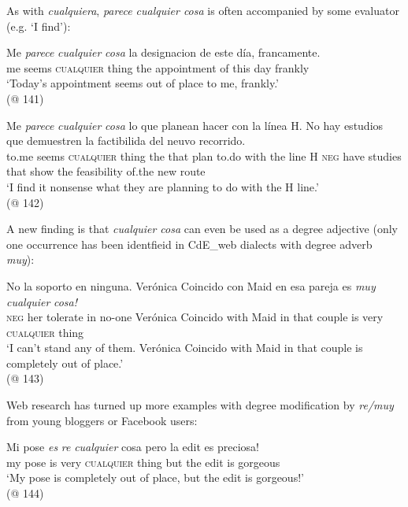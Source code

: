 As with \textit{cualquiera}, \textit{parece cualquier cosa} is often accompanied by some evaluator (e.g. ‘I find’):

\ea \label{ex:key:256} %
    \gll Me \textit{parece} \textit{cualquier} \textit{cosa} la designacion de este día, francamente.\\
    me seems \textsc{cualquier} thing the appointment of this day frankly\\
    \glt ‘Today’s appointment seems out of place to me, frankly.’\\
    (@ 141)
\z

\ea \label{ex:key:257} %
    \gll Me \textit{parece} \textit{cualquier} \textit{cosa} lo que planean hacer con la línea H. No hay estudios que demuestren la factibilida del neuvo  recorrido.\\
    to.me seems \textsc{cualquier} thing the that plan to.do with the line H \textsc{neg} have studies that show the feasibility of.the new route\\
    \glt ‘I find it nonsense what they are planning to do with the H line.’\\
    (@ 142)
\z

A new finding is that \textit{cualquier cosa} can even be used as a degree adjective (only one occurrence has been identfieid in CdE\_web dialects with degree adverb \textit{muy}):

\ea \label{ex:key:258} %
    \gll No la soporto en ninguna. Verónica Coincido con Maid en esa pareja es \textit{muy} \textit{cualquier} \textit{cosa!}\\
    \textsc{neg} her tolerate in no-one Verónica Coincido with Maid in that couple is very \textsc{cualquier} thing\\
    \glt ‘I can’t stand any of them. Verónica Coincido with Maid in that couple is completely out of place.’\\
    (@ 143)
\z

Web research has turned up more examples with degree modification by \textit{re/muy} from young bloggers or Facebook users:

\ea \label{ex:key:259} %
    \gll Mi pose \textit{es} \textit{re} \textit{cualquier} cosa pero la edit es preciosa!\\
    my pose is very \textsc{cualquier} thing but the edit is gorgeous\\
    \glt ‘My pose is completely out of place, but the edit is gorgeous!’\\
    (@ 144)
\z

